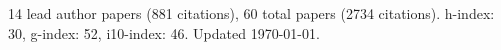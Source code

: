 14 lead author papers (881 citations),
60 total papers (2734 citations).\newline
h-index: 30, g-index: 52, i10-index: 46. Updated \today.